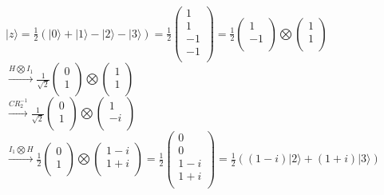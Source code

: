 \documentclass[a4paper]{scrartcl}
\begin{document}
$|z\rangle = \frac{1}{2} (|0\rangle + |1\rangle - |2\rangle - |3\rangle) = \frac{1}{2} \begin{pmatrix} 1\\1\\-1\\-1\\\end{pmatrix} = \frac{1}{2} \begin{pmatrix} 1\\-1\\\end{pmatrix} \bigotimes \begin{pmatrix} 1\\1\\\end{pmatrix}$\\
$\xrightarrow{H\bigotimes I_1} \frac{1}{\sqrt{2}} \begin{pmatrix} 0\\1\\\end{pmatrix} \bigotimes \begin{pmatrix} 1\\1\\\end{pmatrix}$\\
$\xrightarrow{CR_2^{-1}}\frac{1}{\sqrt{2}} \begin{pmatrix} 0\\1\\\end{pmatrix} \bigotimes \begin{pmatrix} 1\\-i\\\end{pmatrix}$\\
$\xrightarrow{I_1\bigotimes H} \frac{1}{2} \begin{pmatrix} 0\\1\\\end{pmatrix} \bigotimes \begin{pmatrix} 1-i\\1+i\\\end{pmatrix} = \frac{1}{2}\begin{pmatrix} 0\\0\\1-i\\1+i\\\end{pmatrix} = \frac{1}{2} ((1-i)|2\rangle + (1+i)|3\rangle)$\\
\end{document}

